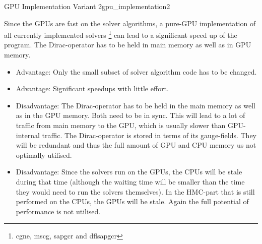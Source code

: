 \documentclass{article}
\theoremstyle{plain} %
\theoremstyle{convention} %
\theoremstyle{remark} %
\numberwithin{equation}{section}
\begin{document}
\begin{proposal}{GPU Implementation Variant 2}{gpu_implementation2} %

Since the GPUs are fast on the solver algorithms, a pure-GPU implementation of all currently implemented solvers \footnote{\acrshort{cgne}, \acrshort{mscg}, \acrshort{sapgcr} and \acrshort{dflsapgcr}} can lead to a significant speed up of the program. The Dirac-operator has to be held in main memory as well as in GPU memory.

\begin{itemize}
    \item Advantage: Only the small subset of solver algorithm code has to be changed.
    \item Advantage: Significant speedups with little effort.
    \item Disadvantage: The Dirac-operator has to be held in the main memory as well as in the GPU memory. Both need to be in sync. This will lead to a lot of traffic from main memory to the GPU, which is usually slower than GPU-internal traffic. The Dirac-operator is stored in terms of its gauge-fields. They will be redundant and thus the full amount of GPU and CPU memory us not optimally utilised.
    \item Disadvantage: Since the solvers run on the GPUs, the CPUs will be stale during that time (although the waiting time will be smaller than the time they would need to run the solvers themselves). In the HMC-part that is still performed on the CPUs, the GPUs will be stale. Again the full potential of performance is not utilised.
\end{itemize}

\end{proposal}
\end{document}
